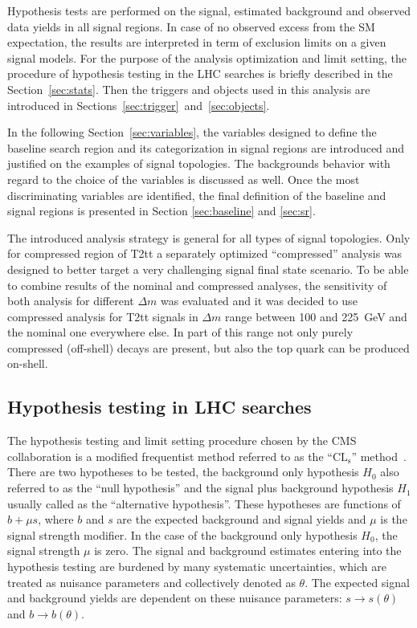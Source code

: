 Hypothesis tests are performed on the signal, estimated background and observed data yields in all signal regions. In case of no observed excess from the SM expectation, the results are interpreted in term of exclusion limits on a given signal models. For the purpose of the analysis optimization and limit setting, the procedure of hypothesis testing in the LHC searches is briefly described in the Section~\ref{sec:stats}. Then the triggers and objects used in this analysis are introduced in Sections~\ref{sec:trigger}~and~\ref{sec:objects}.
 
In the following Section~\ref{sec:variables}, the variables designed to define the baseline search region and its categorization in signal regions are introduced and justified on the examples of signal topologies. The backgrounds behavior with regard to the choice of the variables is discussed as well. Once the most discriminating variables are identified, the final definition of the baseline and signal regions is presented in Section \ref{sec:baseline} and \ref{sec:sr}. 

The introduced analysis strategy is general for all types of signal topologies. Only for compressed region of T2tt a separately optimized ``compressed'' analysis was designed to better target a very challenging signal final state scenario. To be able to combine results of the nominal and compressed analyses, the sensitivity of both analysis for different $\Delta m$ was evaluated and it was decided to use compressed analysis for T2tt signals in $\Delta m$ range between 100 and 225~GeV and the nominal one everywhere else. In part of this range not only purely compressed (off-shell) decays are present, but also the top quark can be produced on-shell.



\subsection{Hypothesis testing in LHC searches~\label{sec:stats} }

The hypothesis testing and limit setting procedure chosen by the CMS collaboration is a modified frequentist method referred to as the ``$\mathrm{CL_{s}}$'' method~\cite{Read:2002hq, CMS-NOTE-2011-005}. There are two hypotheses to be tested, the background only hypothesis $H_{0}$ also referred to as the ``null hypothesis'' and the signal plus background hypothesis $H_{1}$ usually called as the ``alternative hypothesis''. These hypotheses are functions of $b+\mu s$, where $b$ and $s$ are the expected background and signal yields and $\mu$ is the signal strength modifier. In the case of the background only hypothesis $H_{0}$, the signal strength $\mu$ is zero. The signal and background estimates entering into the hypothesis testing are burdened by many systematic uncertainties, which are  treated as nuisance parameters and collectively denoted as $\theta$. The expected signal and background yields are dependent on these nuisance parameters: $s \to s(\theta)$ and $b \to b(\theta)$.

